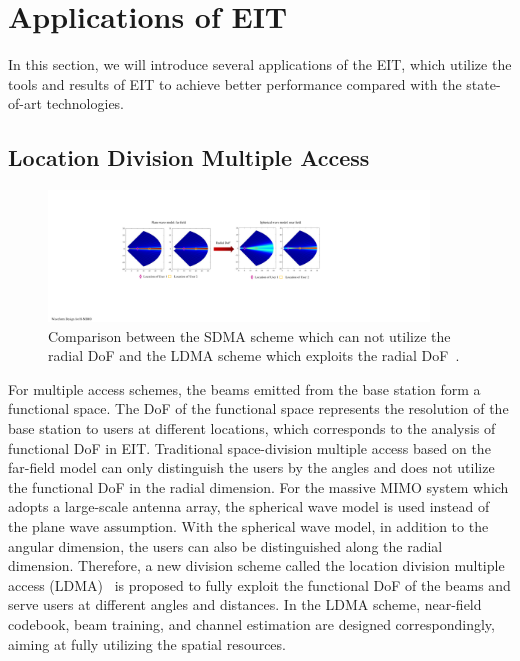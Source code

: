 \documentclass[journal,twocolumn]{IEEEtran}
\begin{document}
\section{Applications of EIT}
In this section, we will introduce several applications of the EIT, which utilize the tools and results of EIT to achieve better performance compared with the state-of-art technologies.
\subsection{Location Division Multiple Access}
\begin{figure}
	\centering 
	\includegraphics[width=0.9\textwidth]{figures/LDMA.pdf} 
	\caption{Comparison between the SDMA scheme which can not utilize the radial DoF and the LDMA scheme which exploits the radial DoF~\cite{wu2022multiple}. }
	\label{fig:LDMA}
\end{figure}
For multiple access schemes, the beams emitted from the base station form a functional space. The DoF of the functional space represents the resolution of the base station to users at different locations, which corresponds to the analysis of functional DoF in EIT. 
Traditional space-division multiple access based on the far-field model can only distinguish the users by the angles and does not utilize the functional DoF in the radial dimension. 
For the massive MIMO system which adopts a large-scale antenna array, the spherical wave model is used instead of the plane wave assumption. 
With the spherical wave model, in addition to the angular dimension, the users can also be distinguished along the radial dimension. 
Therefore, a new division scheme called the location division multiple access (LDMA)~\cite{wu2022multiple} is proposed to fully exploit the functional DoF of the beams and serve users at different angles and distances. 
In the LDMA scheme, near-field codebook, beam training, and channel estimation are designed correspondingly, aiming at fully utilizing the spatial resources. 
\end{document}
